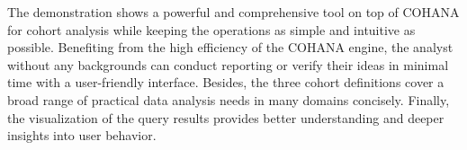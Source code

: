 The demonstration shows a powerful and comprehensive tool on top of COHANA for cohort analysis while keeping the operations as simple and intuitive as possible. Benefiting from the high efficiency of the COHANA engine, the analyst without any backgrounds can conduct reporting or verify their ideas in minimal time with a user-friendly interface. Besides, the three cohort definitions cover a broad range of practical data analysis needs in many domains concisely. Finally, the visualization of the query results provides better understanding and deeper insights into user behavior.